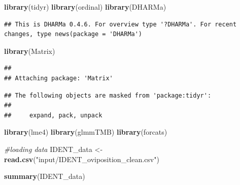 \documentclass[
]{article}
\newenvironment{Shaded}{\begin{snugshade}}{\end{snugshade}}
\newcommand{\CommentTok}[1]{\textcolor[rgb]{0.56,0.35,0.01}{\textit{#1}}}
\newcommand{\FunctionTok}[1]{\textcolor[rgb]{0.13,0.29,0.53}{\textbf{#1}}}
\newcommand{\NormalTok}[1]{#1}
\newcommand{\OtherTok}[1]{\textcolor[rgb]{0.56,0.35,0.01}{#1}}
\newcommand{\StringTok}[1]{\textcolor[rgb]{0.31,0.60,0.02}{#1}}
\begin{document}
\begin{Shaded}
\begin{Highlighting}[]
\FunctionTok{library}\NormalTok{(tidyr)}
\FunctionTok{library}\NormalTok{(ordinal)}
\FunctionTok{library}\NormalTok{(DHARMa)}
\end{Highlighting}
\end{Shaded}

\begin{verbatim}
## This is DHARMa 0.4.6. For overview type '?DHARMa'. For recent changes, type news(package = 'DHARMa')
\end{verbatim}

\begin{Shaded}
\begin{Highlighting}[]
\FunctionTok{library}\NormalTok{(Matrix)}
\end{Highlighting}
\end{Shaded}

\begin{verbatim}
## 
## Attaching package: 'Matrix'
\end{verbatim}

\begin{verbatim}
## The following objects are masked from 'package:tidyr':
## 
##     expand, pack, unpack
\end{verbatim}

\begin{Shaded}
\begin{Highlighting}[]
\FunctionTok{library}\NormalTok{(lme4)}
\FunctionTok{library}\NormalTok{(glmmTMB)}
\FunctionTok{library}\NormalTok{(forcats)}

\CommentTok{\#loading data }
\NormalTok{IDENT\_data }\OtherTok{\textless{}{-}} \FunctionTok{read.csv}\NormalTok{(}\StringTok{"input/IDENT\_oviposition\_clean.csv"}\NormalTok{)}

\FunctionTok{summary}\NormalTok{(IDENT\_data)}
\end{Highlighting}
\end{Shaded}
\end{document}
